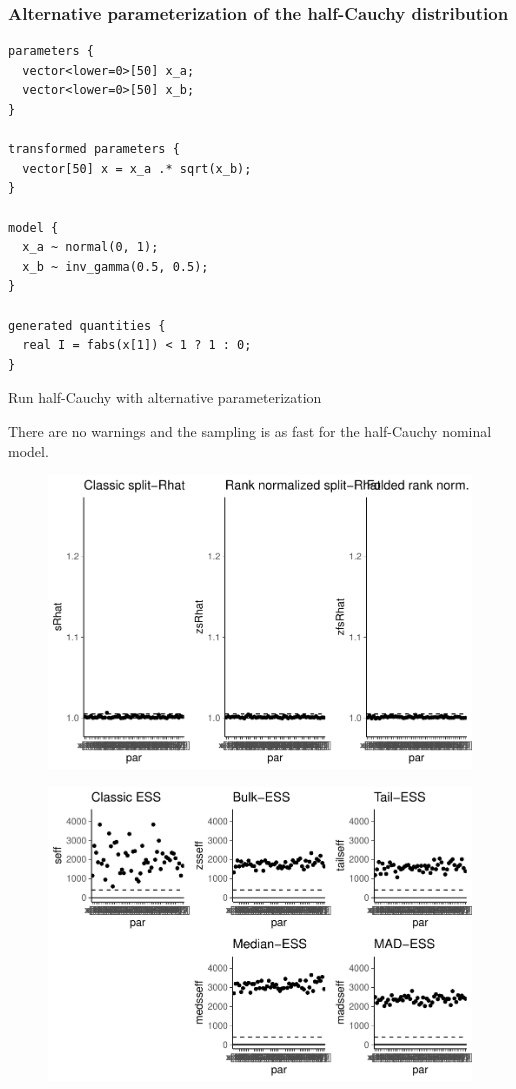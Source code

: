 \documentclass[american,]{article}
\begin{document}
\hypertarget{alternative-parameterization-of-the-half-cauchy-distribution}{%
\subsubsection*{Alternative parameterization of the half-Cauchy
distribution}\label{alternative-parameterization-of-the-half-cauchy-distribution}}

\begin{verbatim}
parameters {
  vector<lower=0>[50] x_a;
  vector<lower=0>[50] x_b;
}

transformed parameters {
  vector[50] x = x_a .* sqrt(x_b);
}

model {
  x_a ~ normal(0, 1);
  x_b ~ inv_gamma(0.5, 0.5);
}

generated quantities {
  real I = fabs(x[1]) < 1 ? 1 : 0;
}
\end{verbatim}

Run half-Cauchy with alternative parameterization

There are no warnings and the sampling is as fast for the half-Cauchy
nominal model.

\begin{figure}[t]
  \centering
  \includegraphics[width=0.6\linewidth]{graphics/rhat-fit-half-reparam-1.pdf}
\end{figure}

\begin{figure}[t]
  \centering
  \includegraphics[width=0.6\linewidth]{graphics/ess-fit-half-reparam-1.pdf}
\end{figure}
\end{document}
